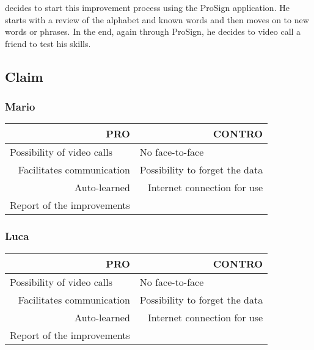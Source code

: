 decides to start this improvement process using the ProSign application. He starts with a review of the alphabet and known words and then moves on to new words or phrases. In the end, again through ProSign, he decides to video call a friend to test his skills.

\clearpage
\subsection{Claim}
\subsubsection{Mario}
\begin{table}[h]
	\begin{tabular}{|r|r|}
		\hline
		PRO                                              & CONTRO                               \\ \hline
		\multicolumn{1}{|l|}{Possibility of video calls} & \multicolumn{1}{l|}{No face-to-face} \\ \hline
		Facilitates communication                        & Possibility to forget the data       \\ \hline
		Auto-learned                                     & Internet connection for use          \\ \hline
		\multicolumn{1}{|l|}{Report of the improvements} & \multicolumn{1}{l|}{}                \\ \hline
	\end{tabular}
\end{table}

\subsubsection{Luca}
\begin{table}[h]
	\begin{tabular}{|r|r|}
		\hline
		PRO                                              & CONTRO                               \\ \hline
		\multicolumn{1}{|l|}{Possibility of video calls} & \multicolumn{1}{l|}{No face-to-face} \\ \hline
		Facilitates communication                        & Possibility to forget the data       \\ \hline
		Auto-learned                                     & Internet connection for use          \\ \hline
		\multicolumn{1}{|l|}{Report of the improvements} & \multicolumn{1}{l|}{}                \\ \hline
	\end{tabular}
\end{table}